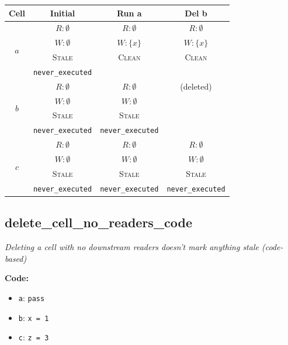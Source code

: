 \documentclass{article}
\begin{document}
\begin{center}
\small
\begin{tabular}{|c|c|c|c|}
\hline
\textbf{Cell} & \textbf{Initial} & \textbf{Run a} & \textbf{Del b} \\
\hline
\multirow{4}{*}{$a$}
  & $R: \emptyset$ & $R: \emptyset$ & $R: \emptyset$ \\
  & $W: \emptyset$ & $W: \{x\}$ & $W: \{x\}$ \\
  & \textsc{Stale} & \textsc{Clean} & \textsc{Clean} \\
  & \footnotesize\texttt{never\_executed} &  &  \\
\hline
\multirow{4}{*}{$b$}
  & $R: \emptyset$ & $R: \emptyset$ & (deleted) \\
  & $W: \emptyset$ & $W: \emptyset$ &  \\
  & \textsc{Stale} & \textsc{Stale} &  \\
  & \footnotesize\texttt{never\_executed} & \footnotesize\texttt{never\_executed} &  \\
\hline
\multirow{4}{*}{$c$}
  & $R: \emptyset$ & $R: \emptyset$ & $R: \emptyset$ \\
  & $W: \emptyset$ & $W: \emptyset$ & $W: \emptyset$ \\
  & \textsc{Stale} & \textsc{Stale} & \textsc{Stale} \\
  & \footnotesize\texttt{never\_executed} & \footnotesize\texttt{never\_executed} & \footnotesize\texttt{never\_executed} \\
\hline
\end{tabular}
\end{center}


\subsection{delete\_cell\_no\_readers\_code}
\textit{Deleting a cell with no downstream readers doesn't mark anything stale (code-based)}

\textbf{Code:}
\begin{itemize}
  \item \texttt{a}: \verb|pass|
  \item \texttt{b}: \verb|x = 1|
  \item \texttt{c}: \verb|z = 3|
\end{itemize}
\end{document}
